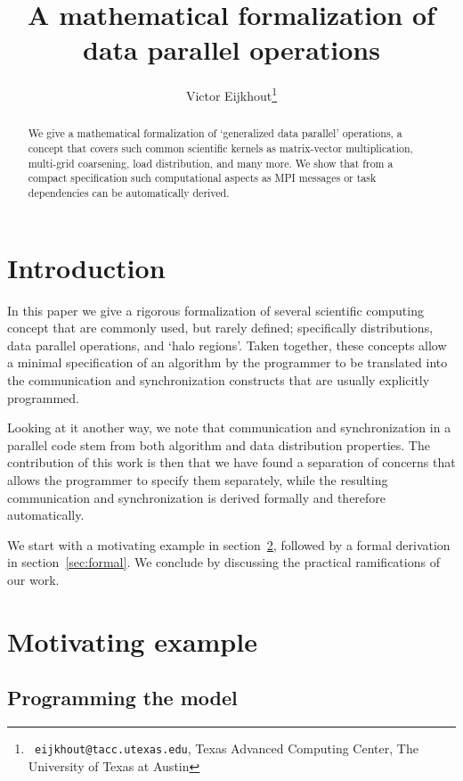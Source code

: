 \documentclass[11pt,fleqn]{article}
\title{A mathematical formalization of data parallel operations}
\author{Victor Eijkhout\thanks{{\tt
      eijkhout@tacc.utexas.edu}, Texas Advanced Computing Center, The
    University of Texas at Austin}}
\begin{document}
\maketitle

\begin{abstract}
  We give a mathematical formalization of `generalized data parallel'
  operations, a concept that covers such common scientific kernels as
  matrix-vector multiplication, multi-grid coarsening, load
  distribution, and many more.
  We show that from a compact specification such computational aspects
  as MPI messages or task dependencies can be automatically derived.
\end{abstract}

\acresetall

\section{Introduction}

In this paper we give a rigorous formalization of several scientific
computing concept that are commonly used, but rarely defined;
specifically distributions,
data parallel operations, and `halo regions'.
%
Taken together, these concepts allow a minimal specification of an
algorithm by the programmer to be translated into the communication
and synchronization constructs that are usually explicitly programmed.

Looking at it another way, we note that communication and
synchronization in a parallel code stem from both algorithm and data
distribution properties. The contribution of this work is then that we
have found a separation of concerns that allows the programmer to
specify them separately, while the resulting communication and
synchronization is derived formally and therefore automatically.

We start with a motivating example in
section~\ref{sec:threepoint-example}, followed by a formal derivation
in section~\ref{sec:formal}. We conclude by discussing the
practical ramifications of our work.

\section{Motivating example}
\label{sec:threepoint-example}

\subsection{Programming the model}

\end{document}
